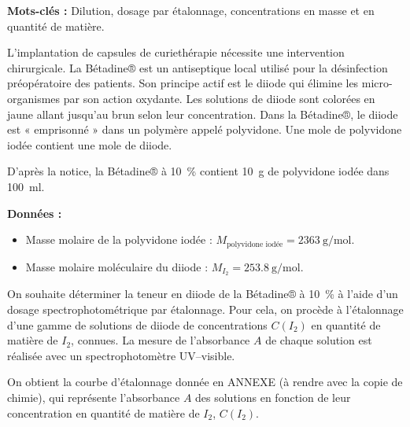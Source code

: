 \label{exo:antiseptique}

\textbf{Mots-clés :} Dilution, dosage par étalonnage, concentrations en masse et en quantité
de matière.
\medskip

L'implantation de capsules de curiethérapie nécessite une intervention chirurgicale.
La Bétadine® est un antiseptique local utilisé pour la désinfection préopératoire des patients.
Son principe actif est le diiode  qui élimine les micro-organismes par son action oxydante.
Les solutions de diiode sont colorées en jaune allant jusqu'au brun selon leur concentration.
Dans la Bétadine®, le diiode est « emprisonné » dans un polymère appelé polyvidone.
Une mole de polyvidone iodée contient une mole de diiode.
\medskip

D'après la notice, la Bétadine® à \qty{10}{\percent} contient \qty{10}{\g} de polyvidone iodée dans \qty{100}{\ml}.

\textbf{Données :}
\begin{itemize}
  \item Masse molaire de la polyvidone iodée : $M_\text{polyvidone iodée} = \qty{2363}{\g\per\mole}$.
  \item Masse molaire moléculaire du diiode : $M_{I_2} = \qty{253,8}{\g\per\mole}$.
\end{itemize}

On souhaite déterminer la teneur en diiode de la Bétadine® à \qty{10}{\percent} à l'aide d'un dosage spectrophotométrique par étalonnage.
Pour cela, on procède à l'étalonnage d'une gamme de solutions de diiode de concentrations $C(I_2)$ en quantité de matière de $I_2$, connues.
La mesure de l'absorbance $A$ de chaque solution est réalisée avec un spectrophotomètre UV–visible.
\medskip 

On obtient la courbe d'étalonnage donnée en ANNEXE (à rendre avec la copie de
chimie), qui représente l'absorbance $A$ des solutions en fonction de leur concentration
en quantité de matière de $I_2$, $C(I_2)$.



